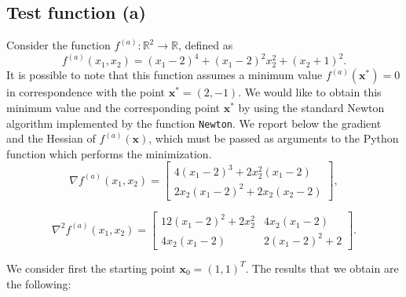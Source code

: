 \documentclass[a4paper,11pt]{article}
\newcommand{\R}{\mathbb{R}}
\begin{document}
	
	\subsection{Test function (a)}
	Consider the function $f^{(a)}: \R^{2}\rightarrow \R$, defined as
	\begin{equation}
		f^{(a)}(x_{1},x_{2}) = (x_{1}-2)^{4} + (x_{1}-2)^{2}x_{2}^{2} + (x_{2}+1)^{2}.
	\end{equation}
	It is possible to note that this function assumes a minimum value $f^{(a)}(\textbf{x}^*)=0$ in correspondence with the point $\textbf{x}^*=(2,-1)$. We would like to obtain this minimum value and the corresponding point $\textbf{x}^*$ by using the standard Newton algorithm implemented by the function \texttt{Newton}. We report below the gradient and the Hessian of $f^{(a)}(\textbf{x})$, which must be passed as arguments to the Python function which performs the minimization.
	\begin{equation}
		\nabla f^{(a)}(x_{1},x_{2}) = \begin{bmatrix}
			4(x_{1}-2)^{3} + 2x_{2}^{2}(x_{1}-2)\\
			2x_{2}(x_{1}-2)^{2} + 2x_{2}(x_{2}-2)
		\end{bmatrix},
	\end{equation}

		\begin{equation}
		\nabla^{2} f^{(a)}(x_{1},x_{2}) = \begin{bmatrix}
			12(x_{1}-2)^{2} + 2x_{2}^{2} & 4x_{2}(x_{1}-2)\\
			4x_{2}(x_{1}-2) & 2(x_{1}-2)^{2} + 2
		\end{bmatrix}.
	\end{equation}
	
	\noindent We consider first the starting point $\textbf{x}_{0}=(1,1)^{T}$. The results that we obtain are the following:
	
\end{document}
